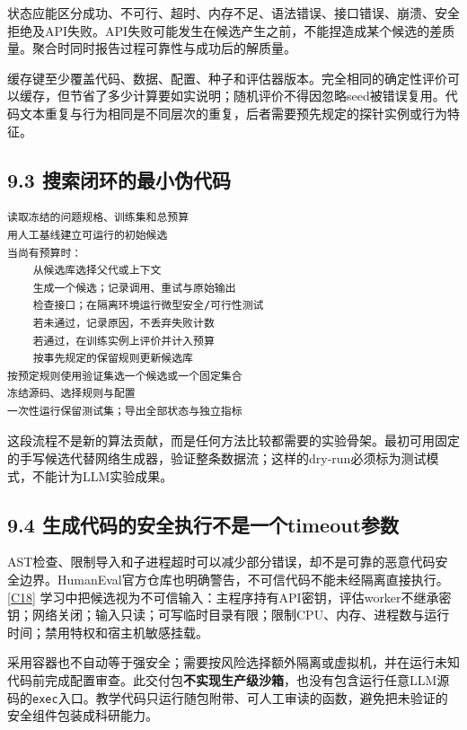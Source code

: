 状态应能区分成功、不可行、超时、内存不足、语法错误、接口错误、崩溃、安全拒绝及API失败。API失败可能发生在候选产生之前，不能捏造成某个候选的差质量。聚合时同时报告过程可靠性与成功后的解质量。

缓存键至少覆盖代码、数据、配置、种子和评估器版本。完全相同的确定性评价可以缓存，但节省了多少计算要如实说明；随机评价不得因忽略seed被错误复用。代码文本重复与行为相同是不同层次的重复，后者需要预先规定的探针实例或行为特征。

\subsection{9.3
搜索闭环的最小伪代码}\label{ux641cux7d22ux95edux73afux7684ux6700ux5c0fux4f2aux4ee3ux7801}

\begin{verbatim}
读取冻结的问题规格、训练集和总预算
用人工基线建立可运行的初始候选
当尚有预算时：
    从候选库选择父代或上下文
    生成一个候选；记录调用、重试与原始输出
    检查接口；在隔离环境运行微型安全/可行性测试
    若未通过，记录原因，不丢弃失败计数
    若通过，在训练实例上评价并计入预算
    按事先规定的保留规则更新候选库
按预定规则使用验证集选一个候选或一个固定集合
冻结源码、选择规则与配置
一次性运行保留测试集；导出全部状态与独立指标
\end{verbatim}

这段流程不是新的算法贡献，而是任何方法比较都需要的实验骨架。最初可用固定的手写候选代替网络生成器，验证整条数据流；这样的dry-run必须标为测试模式，不能计为LLM实验成果。

\subsection{9.4
生成代码的安全执行不是一个timeout参数}\label{ux751fux6210ux4ee3ux7801ux7684ux5b89ux5168ux6267ux884cux4e0dux662fux4e00ux4e2atimeoutux53c2ux6570}

AST检查、限制导入和子进程超时可以减少部分错误，却不是可靠的恶意代码安全边界。HumanEval官方仓库也明确警告，不可信代码不能未经隔离直接执行。\href{https://github.com/openai/human-eval}{{[}C18{]}}
学习中把候选视为不可信输入：主程序持有API密钥，评估worker不继承密钥；网络关闭；输入只读；可写临时目录有限；限制CPU、内存、进程数与运行时间；禁用特权和宿主机敏感挂载。

采用容器也不自动等于强安全；需要按风险选择额外隔离或虚拟机，并在运行未知代码前完成配置审查。此交付包\textbf{不实现生产级沙箱}，也没有包含运行任意LLM源码的\texttt{exec}入口。教学代码只运行随包附带、可人工审读的函数，避免把未验证的安全组件包装成科研能力。

